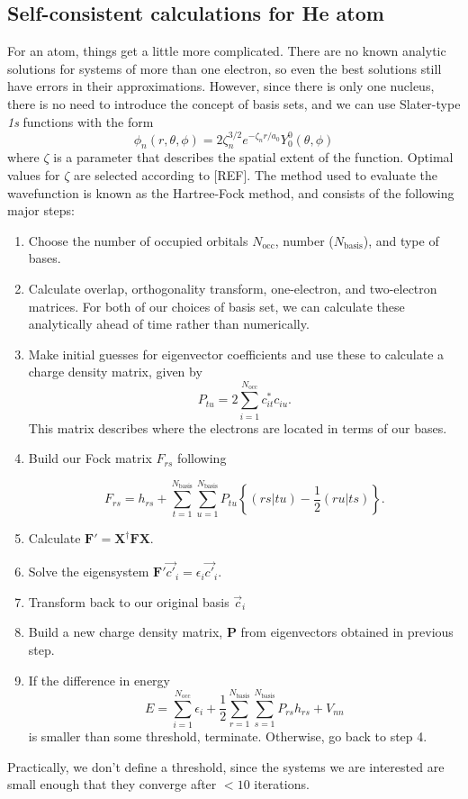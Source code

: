 \documentclass{achemso}
\newcommand{\matr}[1]{\mathbf{#1}}
\begin{document}
\subsection{Self-consistent calculations for He atom}
For an  atom, things get a little more complicated.  There are no known analytic solutions for systems of more than one electron, so even the best solutions still have errors in their approximations.  However, since there is only one nucleus, there is no need to introduce the concept of basis sets, and we can use Slater-type \textit{1s} functions with the form 
\begin{equation}
	\phi_n(r,\theta,\phi) = 2\zeta_n^{3/2}e^{-\zeta_nr/a_0}Y_0^0(\theta,\phi)
\end{equation}
where $\zeta$ is a parameter that describes the spatial extent of the function.  Optimal values for $\zeta$ are selected according to [REF].  The method used to evaluate the wavefunction is known as the Hartree-Fock method, and consists of the following major steps:
\begin{enumerate}
	\item Choose the number of occupied orbitals $N_\mathrm{occ}$, number ($N_\mathrm{basis}$), and type of bases.
	\item Calculate overlap, orthogonality transform, one-electron, and two-electron matrices.  For both of our choices of basis set, we can calculate these analytically ahead of time rather than numerically.
	\item Make initial guesses for eigenvector coefficients and use these to calculate a charge density matrix, given by
\begin{equation}
	P_{tu} = 2 \sum_{i=1}^{N_{\mathrm{occ}}}c^*_{it}c_{iu}.
\end{equation}
	This matrix describes where the electrons are located in terms of our bases.
	\item Build our Fock matrix $F_{rs}$ following

\begin{equation}
	F_{rs} = h_{rs} + \sum_{t=1}^{N_\mathrm{basis}}\sum_{u=1}^{N_\mathrm{basis}}P_{tu}\left\{(rs|tu) -\frac{1}{2}(ru|ts)\right\}.
\end{equation}
	\item Calculate $\matr{F}' = \matr{X}^\dag\matr{F}\matr{X}$.
	\item Solve the eigensystem $\matr{F}'\vec{c'}_i=\epsilon_i\vec{c'}_i$.
	\item Transform back to our original basis $\vec{c}_i$
	\item Build a new charge density matrix, $\matr{P}$ from eigenvectors obtained in previous step.
	\item If the difference in energy 
\begin{equation}
	E = \sum_{i=1}^{N_\mathrm{occ}}\epsilon_i + \frac{1}{2} \sum_{r=1}^{N_\mathrm{basis}} \sum_{s=1}^{N_\mathrm{basis}}P_{rs}h_{rs}+V_{nn}
	\label{eq:hf_energy}
\end{equation}
is smaller than some threshold, terminate.  Otherwise, go back to step 4.
\end{enumerate}
Practically, we don't define a threshold, since the systems we are interested are small enough that they converge after $<10$ iterations. 
\end{document}
